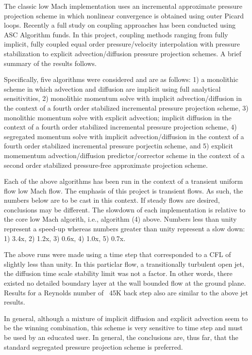 The classic low Mach implementation uses an incremental approximate 
pressure projection scheme in which nonlinear convergence is obtained 
using outer Picard loops. Recently a full study on coupling approaches 
has been conducted using ASC Algorithm funds. In this project, coupling 
methods ranging from fully implicit, fully coupled equal order 
pressure/velocity interpolation with pressure stabilization to 
explicit advection/diffusion pressure projection schemes. A brief summary of the 
results follows. 

Specifically, five algorithms
were considered and are as follows: 1) a monolithic scheme in which 
advection and diffusion are implicit using full analytical sensitivities, 
2) monolithic momentum solve with implicit advection/diffusion
in the context of a fourth order stabilized incremental pressure projection
scheme, 3) monolithic momentum solve with explicit advection; implicit diffusion
in the context of a fourth order stabilized incremental pressure projection
scheme, 4) segregated momentum solve with implicit advection/diffusion in the
context of a fourth order stabilized incremental pressure porjectin scheme, and 
5) explicit momementum advection/diffusion predictor/corrector scheme in
the context of a second order stabilized pressure-free approximate projection
scheme.

Each of the above algorithms has been run in the context of a transient 
uniform flow low Mach flow. The emphasis of this project is transient flows. 
As such, the numbers below are to be cast in this context. If steady flows
are desired, conclusions may be different. The slowdown of each implementation
is relative to the core low Mach algorith, i.e., algorithm (4) above. Numbers less
than unity represent a speed-up whereas numbers greater than unity represent
a slow down: 1) 3.4x, 2) 1.2x, 3) 0.6x, 4) 1.0x, 5) 0.7x.

The above runs were made using a time step that corresponded to a CFL of slightly
less than unity. In this particlar flow, a transitionally turbulent open jet,
the diffusion time scale stability limit was not a factor. In other words, there
existed no detailed boundary layer at the wall bounded flow at the ground 
plane. Results for a Reynolds number of ~45K back step also are similar to the above 
jet results. 

In general, although a mixture of implicit diffusion and explicit advection
seem to be the winning combination, this scheme is very sensitive to
time step and must be used by an educated user. In general, the conclusions
are, thus far, that the standard segregated pressure projection scheme
is preferred.


